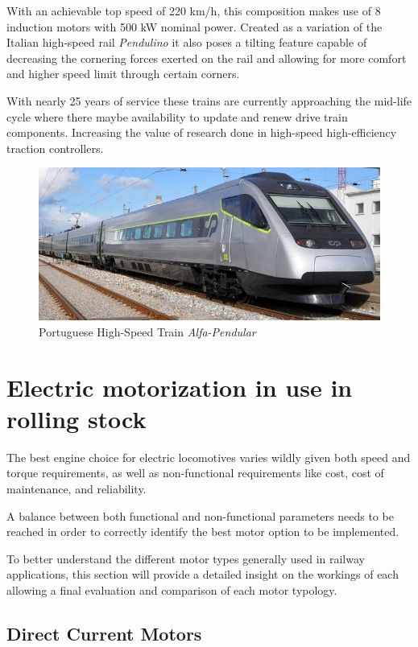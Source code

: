 With an achievable top speed of 220 km/h, this composition makes use of 8 induction motors with 500 kW nominal power. Created as a variation of the Italian high-speed rail \textit{Pendulino} it also poses a tilting feature capable of decreasing the cornering forces exerted on the rail and allowing for more comfort and higher speed limit through certain corners.

With nearly 25 years of service these trains are currently approaching the mid-life cycle where there maybe availability to update and renew drive train components. Increasing the value of research done in high-speed high-efficiency traction controllers.

\begin{figure}[h]
    \centering
    \includegraphics[scale =0.5]{Figures/Alfa.jpg}
    \caption{Portuguese High-Speed Train \textit{Alfa-Pendular}\cite{AlfaPic}}
    \label{fig:Alfa}
\end{figure}
\section{Electric motorization in use in rolling stock}\label{sec:sota_motor}
The best engine choice for electric locomotives varies wildly given both speed and torque requirements, as well as non-functional requirements like cost, cost of maintenance, and reliability.

A balance between both functional and non-functional parameters needs to be reached in order to correctly identify the best motor option to be implemented. 

To better understand the different motor types generally used in railway applications, this section will provide a detailed insight on the workings of each allowing a final evaluation and comparison of each motor typology.  
\subsection{Direct Current Motors}

